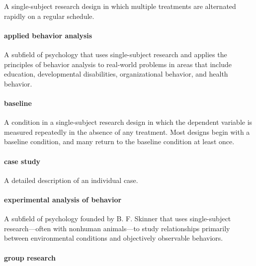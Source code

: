 \documentclass[
]{krantz}
\begin{document}
A single-subject research design in which multiple treatments are alternated rapidly on a regular schedule.

\hypertarget{applied-behavior-analysis}{%
\paragraph*{applied behavior analysis}\label{applied-behavior-analysis}}

A subfield of psychology that uses single-subject research and applies the principles of behavior analysis to real-world problems in areas that include education, developmental disabilities, organizational behavior, and health behavior.

\hypertarget{baseline}{%
\paragraph*{baseline}\label{baseline}}

A condition in a single-subject research design in which the dependent variable is measured repeatedly in the absence of any treatment. Most designs begin with a baseline condition, and many return to the baseline condition at least once.

\hypertarget{case-study}{%
\paragraph*{case study}\label{case-study}}

A detailed description of an individual case.

\hypertarget{experimental-analysis-of-behavior}{%
\paragraph*{experimental analysis of behavior}\label{experimental-analysis-of-behavior}}

A subfield of psychology founded by B. F. Skinner that uses single-subject research---often with nonhuman animals---to study relationships primarily between environmental conditions and objectively observable behaviors.

\hypertarget{group-research}{%
\paragraph*{group research}\label{group-research}}
\end{document}
